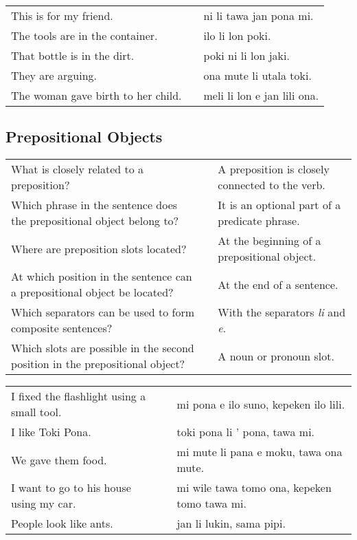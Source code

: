 \begin{supertabular}{p{5,5cm}|ll}
    This is for my friend.             &  & ni li tawa jan pona mi.     \\
    The tools are in the container.    &  & ilo li lon poki.            \\
    That bottle is in the dirt.        &  & poki ni li lon jaki.        \\
    They are arguing.                  &  & ona mute li utala toki.     \\
    The woman gave birth to her child. &  & meli li lon e jan lili ona. \\
\end{supertabular}

\newpage

\subsection*{Prepositional Objects}
\label{'prepositional_objects'}

\begin{supertabular}{p{5,5cm}|ll}
    What is closely related to a preposition?                                    &  & A preposition is closely connected to the verb. \\
    Which phrase in the sentence does the prepositional object belong to?        &  & It is an optional part of a predicate phrase.   \\
    Where are preposition slots located?                                         &  & At the beginning of a prepositional object.     \\
    At which position in the sentence can a prepositional object be located?     &  & At the end of a sentence.                       \\
    Which separators can be used to form composite sentences?                    &  & With the separators \textit{li} and \textit{e}. \\
    Which slots are possible in the second position in the prepositional object? &  & A noun or pronoun slot.                         \\
\end{supertabular}

\begin{supertabular}{p{5,5cm}|ll}
    I fixed the flashlight using a small tool. &  & mi pona e ilo suno, kepeken ilo lili.        \\
    I like Toki Pona.                          &  & toki pona li ' pona, tawa mi.                \\
    We gave them food.                         &  & mi mute li pana e moku, tawa ona mute.       \\
    I want to go to his house using my car.    &  & mi wile tawa tomo ona, kepeken tomo tawa mi. \\
    People look like ants.                     &  & jan li lukin, sama pipi.                     \\
\end{supertabular}

